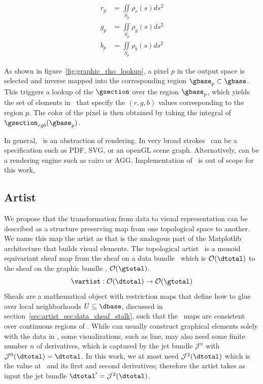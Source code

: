 \documentclass[../main.tex]{subfiles}
\begin{document}
\begin{align}
    r_p &= \iint\limits_{S_p} \rho_r(s)ds^{2}\\
    g_p &= \iint\limits_{S_p} \rho_g(s)ds^{2}\\
    b_p &= \iint\limits_{S_p} \rho_b(s)ds^{2}
\end{align}

As shown in figure~\ref{fig:graphic_rho_lookup}, a pixel $p$ in the output space is selected and inverse mapped into the corresponding region $\gbase_p \subset \gbase$. This triggers a lookup of the $\gsection$ over the region $\gbase_p$, which yields the set of elements in \gfiber\ that specify the $(r, g, b)$ values corresponding to the region $p$. The color of the pixel is then obtained by taking the integral of $\gsection_{rgb}(\gbase_p)$. 

In general, \gsection\ is an abstraction of rendering. In very broad strokes \gsection\  can be a specification such as PDF\cite{bienz1993portable}, SVG\cite{quintScalable2003}, or an openGL scene graph\cite{CarsonOpenGL1997}. Alternatively, \gsection can be a rendering engine such as cairo\cite{CairographicsOrg} or AGG\cite{AntiGrainGeometry}. Implementation of \gsection\ is out of scope for this work,

\subsection{Artist}
\label{sec:artist}
We propose that the transformation from data to visual representation can be described as a structure preserving map from one topological space to another. We name this map the artist as that is the analogous part of the  Matplotlib\cite{hunterArchitectureOpenSource} architecture that builds visual elements. The topological artist \vartist\ is a monoid equivariant sheaf map from the sheaf on a data bundle \dtotal\ which is $\mathcal{O}(\dtotal)$ to the sheaf on the graphic bundle \gtotal, $\mathcal{O}(\gtotal)$. 
\begin{equation}
    \vartist: \mathcal{O}(\dtotal) \rightarrow \mathcal{O}(\gtotal)
\end{equation}
Sheafs are a mathematical object with restriction maps that define how to glue \dsection over local neighborhoods $U \subseteq \dbase$,  discussed in section~\ref{sec:artist_sec:data_sheaf_stalk}, such that the \vartist\ maps are consistent over continuous regions of \dbase. While \vartist can usually construct graphical elements solely with the data in \dsection, some visualizations, such as line, may also need some finite number $n$ of derivatives, which is captured by the jet bundle $\mathcal{J}^n$ \cite{JetBundle2020,musilovaCalculusVariationsJet2016} with $\mathcal{J}^{0}(\dtotal)=\dtotal$. In this work, we at most need $\mathcal{J}^{2}(\dtotal)$ which is the value at \dsection\ and its first and second derivatives; therefore the artist takes as input the jet bundle $\dtotal^{\prime}=\mathcal{J}^{2}(\dtotal)$. 
\end{document}

